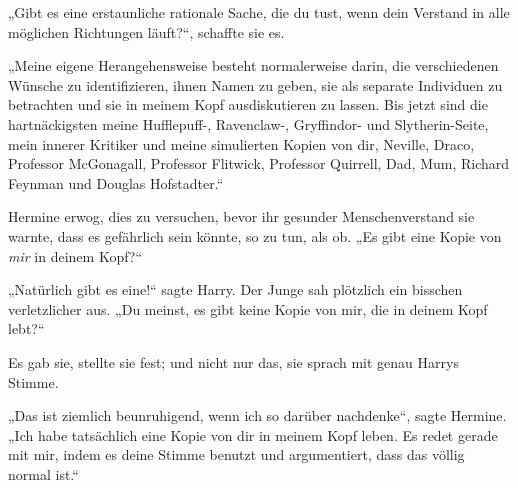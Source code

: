 „Gibt es eine erstaunliche rationale Sache, die du tust, wenn dein Verstand in alle möglichen Richtungen läuft?“, schaffte sie es.

„Meine eigene Herangehensweise besteht normalerweise darin, die verschiedenen Wünsche zu identifizieren, ihnen Namen zu geben, sie als separate Individuen zu betrachten und sie in meinem Kopf ausdiskutieren zu lassen. Bis jetzt sind die hartnäckigsten meine Hufflepuff-, Ravenclaw-, Gryffindor- und Slytherin-Seite, mein innerer Kritiker und meine simulierten Kopien von dir, Neville, Draco, Professor McGonagall, Professor Flitwick, Professor Quirrell, Dad, Mum, Richard Feynman und Douglas Hofstadter.“

Hermine erwog, dies zu versuchen, bevor ihr gesunder Menschenverstand sie warnte, dass es gefährlich sein könnte, so zu tun, als ob.
„Es gibt eine Kopie von \emph{mir} in deinem Kopf?“

„Natürlich gibt es eine!“ sagte Harry. Der Junge sah plötzlich ein bisschen verletzlicher aus. „Du meinst, es gibt keine Kopie von mir, die in deinem Kopf lebt?“

Es gab sie, stellte sie fest; und nicht nur das, sie sprach mit genau Harrys Stimme.

„Das ist ziemlich beunruhigend, wenn ich so darüber nachdenke“, sagte Hermine. „Ich habe tatsächlich eine Kopie von dir in meinem Kopf leben. Es redet gerade mit mir, indem es deine Stimme benutzt und argumentiert, dass das völlig normal ist.“

